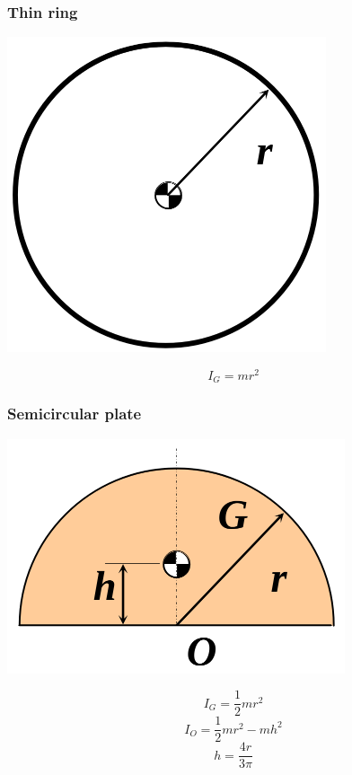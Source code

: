 \documentclass[11pt]{article}
\begin{document}
\subsubsection{Thin ring}
\label{sec:org0a81050}
\begin{center}
\includegraphics[width=.9\linewidth]{./images/moment-of-inertia-thin-ring-diagram.png}
\end{center}
\[I_G = mr^2\]
\subsubsection{Semicircular plate}
\label{sec:org2af66f2}
\begin{center}
\includegraphics[width=.9\linewidth]{./images/moment-of-inertia-semicircular-plate-diagram.png}
\end{center}
\[I_G = \frac{1}{2} mr^2\]
\[I_O = \frac{1}{2} mr^2 - mh^2\]
\[h = \frac{4r}{3 \pi}\]
\end{document}
